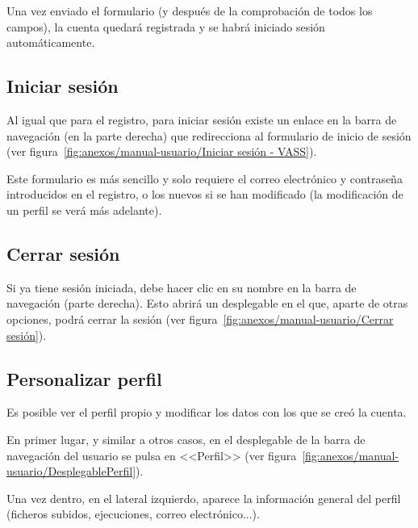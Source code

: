
Una vez enviado el formulario (y después de la comprobación de todos los
campos), la cuenta quedará registrada y se habrá iniciado sesión
automáticamente.

\subsection{Iniciar sesión}

Al igual que para el registro, para iniciar sesión existe un enlace en la barra
de navegación (en la parte derecha) que redirecciona al formulario de inicio de
sesión (ver
figura~\ref{fig:anexos/manual-usuario/Iniciar sesión - VASS}).


Este formulario es más sencillo y solo requiere el correo electrónico y
contraseña introducidos en el registro, o los nuevos si se han modificado (la
modificación de un perfil se verá más adelante).

\subsection{Cerrar sesión}

Si ya tiene sesión iniciada, debe hacer clic en su nombre en la barra de
navegación (parte derecha). Esto abrirá un desplegable en el que, aparte de
otras opciones, podrá cerrar la sesión (ver
figura~\ref{fig:anexos/manual-usuario/Cerrar sesión}).


\subsection{Personalizar perfil}

Es posible ver el perfil propio y modificar los datos con los que se creó la
cuenta.

En primer lugar, y similar a otros casos, en el desplegable de la barra de
navegación del usuario se pulsa en <<Perfil>> (ver
figura~\ref{fig:anexos/manual-usuario/DesplegablePerfil}).


Una vez dentro, en el lateral izquierdo, aparece la información general del
perfil (ficheros subidos, ejecuciones, correo electrónico...).

